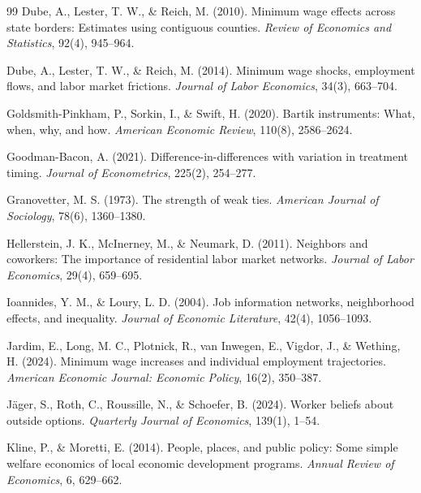 \documentclass[12pt]{article}
\begin{document}
\begin{thebibliography}{99}
Dube, A., Lester, T. W., \& Reich, M. (2010).
Minimum wage effects across state borders: Estimates using contiguous counties.
\textit{Review of Economics and Statistics}, 92(4), 945--964.

Dube, A., Lester, T. W., \& Reich, M. (2014).
Minimum wage shocks, employment flows, and labor market frictions.
\textit{Journal of Labor Economics}, 34(3), 663--704.

Goldsmith-Pinkham, P., Sorkin, I., \& Swift, H. (2020).
Bartik instruments: What, when, why, and how.
\textit{American Economic Review}, 110(8), 2586--2624.

Goodman-Bacon, A. (2021).
Difference-in-differences with variation in treatment timing.
\textit{Journal of Econometrics}, 225(2), 254--277.

Granovetter, M. S. (1973).
The strength of weak ties.
\textit{American Journal of Sociology}, 78(6), 1360--1380.

Hellerstein, J. K., McInerney, M., \& Neumark, D. (2011).
Neighbors and coworkers: The importance of residential labor market networks.
\textit{Journal of Labor Economics}, 29(4), 659--695.

Ioannides, Y. M., \& Loury, L. D. (2004).
Job information networks, neighborhood effects, and inequality.
\textit{Journal of Economic Literature}, 42(4), 1056--1093.

Jardim, E., Long, M. C., Plotnick, R., van Inwegen, E., Vigdor, J., \& Wething, H. (2024).
Minimum wage increases and individual employment trajectories.
\textit{American Economic Journal: Economic Policy}, 16(2), 350--387.

J{\"a}ger, S., Roth, C., Roussille, N., \& Schoefer, B. (2024).
Worker beliefs about outside options.
\textit{Quarterly Journal of Economics}, 139(1), 1--54.

Kline, P., \& Moretti, E. (2014).
People, places, and public policy: Some simple welfare economics of local economic development programs.
\textit{Annual Review of Economics}, 6, 629--662.


\end{thebibliography}
\end{document}
